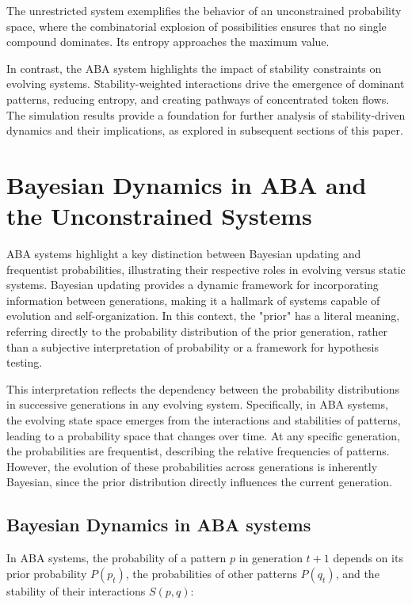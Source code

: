 \documentclass[entropy,article,submit,pdftex,oneauthor]{Definitions/mdpi}
\begin{document}
The unrestricted system exemplifies the behavior of an unconstrained probability space, where the combinatorial explosion of possibilities ensures that no single compound dominates. Its entropy approaches the maximum value.

In contrast, the ABA system highlights the impact of stability constraints on evolving systems. Stability-weighted interactions drive the emergence of dominant patterns, reducing entropy, and creating pathways of concentrated token flows. The simulation results provide a foundation for further analysis of stability-driven dynamics and their implications, as explored in subsequent sections of this paper.

\section{Bayesian Dynamics in ABA and the Unconstrained Systems}

ABA systems highlight a key distinction between Bayesian \cite{mcgrayne2011theory} updating and frequentist probabilities, illustrating their respective roles in evolving versus static systems. Bayesian updating provides a dynamic framework for incorporating information between generations, making it a hallmark of systems capable of evolution and self-organization. In this context, the "prior" has a literal meaning, referring directly to the probability distribution of the prior generation, rather than a subjective interpretation of probability or a framework for hypothesis testing.

This interpretation reflects the dependency between the probability distributions in successive generations in any evolving system. Specifically, in ABA systems, the evolving state space emerges from the interactions and stabilities of patterns, leading to a probability space that changes over time. At any specific generation, the probabilities are frequentist, describing the relative frequencies of patterns. However, the evolution of these probabilities across generations is inherently Bayesian, since the prior distribution directly influences the current generation.

\subsection{Bayesian Dynamics in ABA systems}

In ABA systems, the probability of a pattern \( p \) in generation \( t+1 \) depends on its prior probability \( P(p_t) \), the probabilities of other patterns \( P(q_t) \), and the stability of their interactions \( S(p, q) \):
\end{document}
